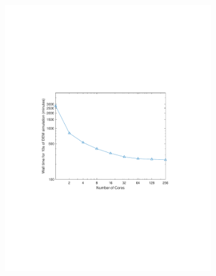 \documentclass[preprint,11pt,authoryear]{elsarticle}
\begin{document}
\begin{figure}
\begin{subfigure}{.45\textwidth}
\centering
\includegraphics[scale=0.6]{rslsts_2mm_timing_mtlb.pdf}
\caption{}
\label{fig:rslts_DEM_2mm_timing}
\end{subfigure}\hfill
\begin{subfigure}{.45\textwidth}
\centering

\end{subfigure}
\end{figure}
\end{document}
